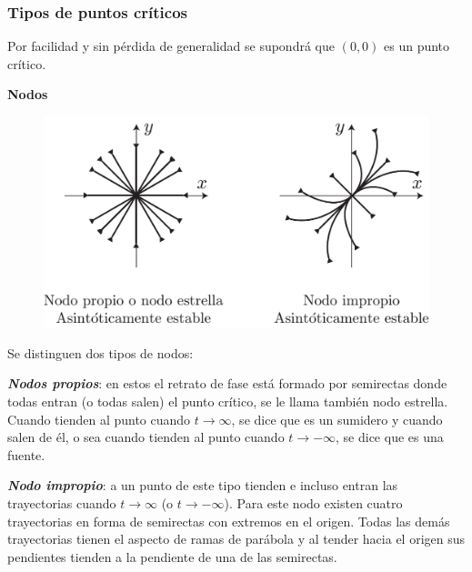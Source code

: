 \documentclass[a5paper,doc,10pt,noapacite]{apa6}
\begin{document}
{{\subsubsection{Tipos de puntos críticos}


Por facilidad y sin pérdida de generalidad se supondrá que \((0,0)\) es un punto crítico.

%
\vspace{0.75\baselineskip}
	\textbf{Nodos}\newline

\vspace{-1\baselineskip}
	\begin{figure}[H]
		\captionsetup{justification=centering, labelfont=footnotesize, font=footnotesize}
		\centering
		\includegraphics[scale=0.25]{Graficos/figura2}
		\caption{ }
		\label{fig:M-2}
	\end{figure}

Se distinguen dos tipos de nodos:
\begin{APAenumerate}
	\item \emph{\textbf{Nodos propios}}: en estos el retrato de fase está formado por semirectas donde todas entran (o todas salen) el punto crítico, se le llama también nodo estrella. Cuando tienden al punto cuando \(t\to\infty\), se dice que es un sumidero y cuando salen de él, o sea cuando tienden al punto cuando \(t\to-\infty\), se 	dice que es una fuente.
	
	\item \emph{\textbf{Nodo impropio}}: a un punto de este tipo tienden e incluso entran las trayectorias cuando \(t\to\infty\) (o \(t\to-\infty\)). Para este nodo existen cuatro trayectorias en forma de semirectas con extremos en el 	origen. Todas las demás trayectorias tienen el aspecto de ramas de parábola y al tender hacia el origen sus pendientes tienden a la pendiente de una de las semirectas.
\end{APAenumerate}

}}
\end{document}
